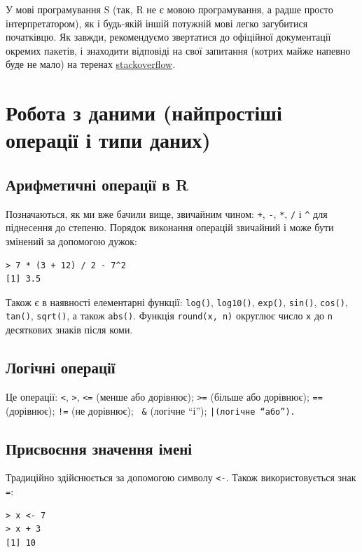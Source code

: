 \documentclass[a4paper, 12pt]{article}
\begin{document}
У мові програмування S (так, R не є мовою програмування, а радше просто інтерпретатором), як і будь-якій іншій потужній мові легко загубитися початківцю. Як завжди, рекомендуємо звертатися до офіційної документації окремих пакетів, і знаходити відповіді на свої запитання (котрих майже напевно буде не мало) на теренах \href{https://stackoverflow.com}{stackoverflow}.

\section{Робота з даними (найпростіші операції і типи даних)}

\subsection{Арифметичні операції в R}

Позначаються, як ми вже бачили вище, звичайним чином: \verb|+|, \verb|-|, \verb|*|, \verb|/| і \verb|^| для піднесення до степеню. Порядок виконання операцій звичайний і може бути змінений за допомогою дужок:
\begin{verbatim}
> 7 * (3 + 12) / 2 - 7^2
[1] 3.5
\end{verbatim}

Також є в наявності елементарні функції: \verb|log()|, \verb|log10()|, \verb|exp()|, \verb|sin()|, \verb|cos()|, \verb|tan()|, \verb|sqrt()|, а також \verb|abs()|. Функція \verb|round(x, n)| округлює число \verb|x| до \verb|n| десяткових знаків після коми.

\subsection{Логічні операції}

Це операції: \verb|<|, \verb|>|, \verb|<=| (менше або дорівнює); \verb|>=| (більше або дорівнює); \verb|==| (дорівнює); \verb|!=| (не дорівнює); \verb| &| (логічне ``і''); \tt|\normalfont (логічне ``або'').

\subsection{Присвоєння значення імені} 
Традиційно здійснюється за допомогою символу \verb|<-|. Також використовується знак \verb|=|:
\begin{verbatim}
> x <- 7
> x + 3
[1] 10
\end{verbatim}
\end{document}
